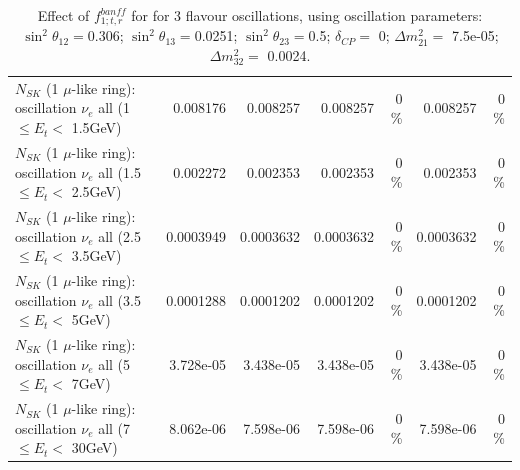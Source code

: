 \begin{table}
\begin{tabular}{| l | r | r | r  r | r  r |}
$N_{SK}$ (1 $\mu$-like ring): oscillation $\nu_{e}$ all (1 $\leq E_{t} <$ 1.5GeV) &        0.008176 &        0.008257 &        0.008257 &        0 \%  &        0.008257 &        0 \%  \\ 
$N_{SK}$ (1 $\mu$-like ring): oscillation $\nu_{e}$ all (1.5 $\leq E_{t} <$ 2.5GeV) &        0.002272 &        0.002353 &        0.002353 &        0 \%  &        0.002353 &        0 \%  \\ 
$N_{SK}$ (1 $\mu$-like ring): oscillation $\nu_{e}$ all (2.5 $\leq E_{t} <$ 3.5GeV) &       0.0003949 &       0.0003632 &       0.0003632 &        0 \%  &       0.0003632 &        0 \%  \\ 
$N_{SK}$ (1 $\mu$-like ring): oscillation $\nu_{e}$ all (3.5 $\leq E_{t} <$ 5GeV) &       0.0001288 &       0.0001202 &       0.0001202 &        0 \%  &       0.0001202 &        0 \%  \\ 
 $N_{SK}$ (1 $\mu$-like ring): oscillation $\nu_{e}$ all (5 $\leq E_{t} <$ 7GeV) &       3.728e-05 &       3.438e-05 &       3.438e-05 &        0 \%  &       3.438e-05 &        0 \%  \\ 
$N_{SK}$ (1 $\mu$-like ring): oscillation $\nu_{e}$ all (7 $\leq E_{t} <$ 30GeV) &       8.062e-06 &       7.598e-06 &       7.598e-06 &        0 \%  &       7.598e-06 &        0 \%  \\ 
\hline
\hline
\end{tabular}
\caption{ Effect of $f_{1; t, r}^{banff}$ for for 3 flavour oscillations, using oscillation parameters:  $\sin^2\theta_{12} = $0.306; $\sin^2\theta_{13} = $0.0251; $\sin^2\theta_{23} = $0.5; $\delta_{CP} = $        0; $\Delta m^2_{21} = $    7.5e-05; $\Delta m^2_{32} = $    0.0024. }
\label{tab:num_banff_01_1RmuT_3f_osc_t13:0.0251}
\end{table}
\clearpage
